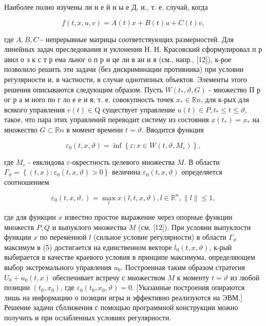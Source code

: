 \documentclass[10pt]{article}
\begin{document}
Наиболее полно изучены ли н е й н ы е Д. и., т. е. случай, когда



\[

f(t, x, u, v)=A(t) x+B(t) u+C(t) v,

\]



где $A, B, C$ - непрерывные матрицы соответствующих размерностей. Для линейных задач преследования и уклонения Н. Н. Красовский сформулировал п р авил $о$ э к с т р ема льног о п р и це ли в ан и я (см., напр., [12]), к-рое позволило решить эти задачи (без дискриминации противника) при условии регулярности и, в частности, в случае однотипных объектов. Элементы этого решения описываются следующим образом. Пусть $W\left(t_{*}, \vartheta, G\right)$ - множество П р ог р а м ного по г ло е е и я, т. е. совокупность точек $x_{*} \in \mathbb{R} n$, для к-рых для всякого управления $v(t) \in \mathrm{Q}$ существует управление $u(t) \in P, t_{*} \leqslant t \leqslant \vartheta$, такое, что пара этих управлений переводит систему из состояния $x\left(t_{*}\right)=x_{*}$ на множество $G \subset \mathbb{R} n$ в момент времени $t=\vartheta$. Вводится функция



\[

\varepsilon_{0}(t, x, \vartheta)=\inf \left\{\varepsilon: x \in W\left(t, \vartheta, M_{\varepsilon}\right)\right\},

\]



где $M_{\varepsilon}$ - евклидова $\varepsilon$-окрестность целевого множества $M$. В области $\Gamma_{\vartheta}=\left\{(t, x): \varepsilon_{0}(t, x, \vartheta)>0\right\}$ величина $\varepsilon_{0}(t, x, \vartheta)$ определяется соотношением



\[

\varepsilon_{0}(t, x, \vartheta,)=\max _{l} x(l, t, x, \vartheta), l \in \mathbb{R}^{n},\|l\| \leqslant 1,

\]



где для функции $x$ известно простое выражение через опорные функции множеств $P, Q$ и выпуклого множества $M$ (см. [12]). При условии выпуклости функции $x$ по переменной $l$ (сильное условие регулярности) в области $\Gamma_{\vartheta}$ максимум в (5) достигается на единственном векторе $l_{0}(t, x, \vartheta)$, к-рый выбирается в качестве краевого условия в принципе максимума, определяющем выбор экстремального управления $u_{0}$. Построенная таким образом стратегия $U_{0} \div u_{0}(t, x)$ обеспечивает встречу с множеством $M$ к моменту $t=\vartheta$ из любой позиции $\left(t_{0}, x_{0}\right)$, где $\varepsilon_{0}\left(t_{0}, x_{0}, \vartheta\right)=0$. [Указанные построения опираются лишь на информацию о позиции игры и эффективно реализуются на ЭВМ.] Решение задачи сбллижения с помощью программной конструкции можно получить и при ослабленных условиях регулярности.
\end{document}
